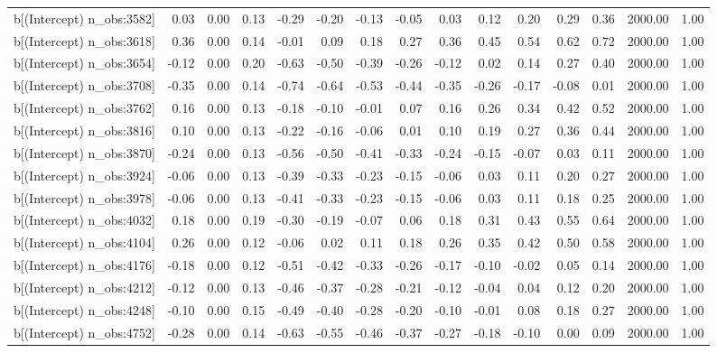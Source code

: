 \begin{table}[ht]
\begin{tabular}{rrrrrrrrrrrrrrr}
  b[(Intercept) n\_obs:3582] & 0.03 & 0.00 & 0.13 & -0.29 & -0.20 & -0.13 & -0.05 & 0.03 & 0.12 & 0.20 & 0.29 & 0.36 & 2000.00 & 1.00 \\ 
  b[(Intercept) n\_obs:3618] & 0.36 & 0.00 & 0.14 & -0.01 & 0.09 & 0.18 & 0.27 & 0.36 & 0.45 & 0.54 & 0.62 & 0.72 & 2000.00 & 1.00 \\ 
  b[(Intercept) n\_obs:3654] & -0.12 & 0.00 & 0.20 & -0.63 & -0.50 & -0.39 & -0.26 & -0.12 & 0.02 & 0.14 & 0.27 & 0.40 & 2000.00 & 1.00 \\ 
  b[(Intercept) n\_obs:3708] & -0.35 & 0.00 & 0.14 & -0.74 & -0.64 & -0.53 & -0.44 & -0.35 & -0.26 & -0.17 & -0.08 & 0.01 & 2000.00 & 1.00 \\ 
  b[(Intercept) n\_obs:3762] & 0.16 & 0.00 & 0.13 & -0.18 & -0.10 & -0.01 & 0.07 & 0.16 & 0.26 & 0.34 & 0.42 & 0.52 & 2000.00 & 1.00 \\ 
  b[(Intercept) n\_obs:3816] & 0.10 & 0.00 & 0.13 & -0.22 & -0.16 & -0.06 & 0.01 & 0.10 & 0.19 & 0.27 & 0.36 & 0.44 & 2000.00 & 1.00 \\ 
  b[(Intercept) n\_obs:3870] & -0.24 & 0.00 & 0.13 & -0.56 & -0.50 & -0.41 & -0.33 & -0.24 & -0.15 & -0.07 & 0.03 & 0.11 & 2000.00 & 1.00 \\ 
  b[(Intercept) n\_obs:3924] & -0.06 & 0.00 & 0.13 & -0.39 & -0.33 & -0.23 & -0.15 & -0.06 & 0.03 & 0.11 & 0.20 & 0.27 & 2000.00 & 1.00 \\ 
  b[(Intercept) n\_obs:3978] & -0.06 & 0.00 & 0.13 & -0.41 & -0.33 & -0.23 & -0.15 & -0.06 & 0.03 & 0.11 & 0.18 & 0.25 & 2000.00 & 1.00 \\ 
  b[(Intercept) n\_obs:4032] & 0.18 & 0.00 & 0.19 & -0.30 & -0.19 & -0.07 & 0.06 & 0.18 & 0.31 & 0.43 & 0.55 & 0.64 & 2000.00 & 1.00 \\ 
  b[(Intercept) n\_obs:4104] & 0.26 & 0.00 & 0.12 & -0.06 & 0.02 & 0.11 & 0.18 & 0.26 & 0.35 & 0.42 & 0.50 & 0.58 & 2000.00 & 1.00 \\ 
  b[(Intercept) n\_obs:4176] & -0.18 & 0.00 & 0.12 & -0.51 & -0.42 & -0.33 & -0.26 & -0.17 & -0.10 & -0.02 & 0.05 & 0.14 & 2000.00 & 1.00 \\ 
  b[(Intercept) n\_obs:4212] & -0.12 & 0.00 & 0.13 & -0.46 & -0.37 & -0.28 & -0.21 & -0.12 & -0.04 & 0.04 & 0.12 & 0.20 & 2000.00 & 1.00 \\ 
  b[(Intercept) n\_obs:4248] & -0.10 & 0.00 & 0.15 & -0.49 & -0.40 & -0.28 & -0.20 & -0.10 & -0.01 & 0.08 & 0.18 & 0.27 & 2000.00 & 1.00 \\ 
  b[(Intercept) n\_obs:4752] & -0.28 & 0.00 & 0.14 & -0.63 & -0.55 & -0.46 & -0.37 & -0.27 & -0.18 & -0.10 & 0.00 & 0.09 & 2000.00 & 1.00 \\ 

\end{tabular}
\end{table}

